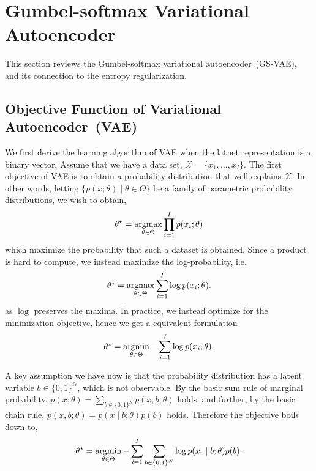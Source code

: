 \documentclass[10pt,letterpaper]{article}
\newcommand{\argmin}{\mathop{\rm argmin}}
\newcommand{\argmax}{\mathop{\rm argmax}}
\begin{document}
\section{Gumbel-softmax Variational Autoencoder}
This section reviews the Gumbel-softmax variational autoencoder~(GS-VAE), and its connection to the entropy regularization.

\subsection{Objective Function of Variational Autoencoder~(VAE)}
We first derive the learning algorithm of VAE when the latnet representation is a binary vector.
Assume that we have a data set, $\mathcal{X}=\{x_1,\dots,x_I\}$.
The first objective of VAE is to obtain a probability distribution that well explains $\mathcal{X}$.
In other words, letting $\{p(x;\theta) \mid \theta\in\Theta\}$ be a family of parametric probability distributions, we wish to obtain,
\begin{align*}
\theta^\star = \argmax_{\theta\in\Theta} \prod_{i=1}^I p(x_i;\theta)
\end{align*}
which maximize the probability that such a dataset is obtained. Since a product is hard to compute, we instead maximize the log-probability, i.e.
\begin{align*}
\theta^\star = \argmax_{\theta\in\Theta} \sum_{i=1}^I \log p(x_i;\theta).
\end{align*}
as $\log$ preserves the maxima.
In practice, we instead optimize for the minimization objective, hence we get a equivalent formulation
\begin{align*}
\theta^\star = \argmin_{\theta\in\Theta} - \sum_{i=1}^I \log p(x_i;\theta).
\end{align*}


A key assumption we have now is that the probability distribution has a latent variable $b\in\{0,1\}^N$, which is not observable.
By the basic sum rule of marginal probability,
$p(x;\theta) = \sum_{b\in\{0,1\}^N}p(x, b;\theta)$ holds, and further,
by the basic chain rule,
$p(x, b;\theta) = p(x \mid b;\theta)p(b)$ holds.
Therefore the objective boils down to,
\begin{align}
\label{eq:vae-obj} \theta^\star = \argmin_{\theta\in\Theta} -\sum_{i=1}^I \sum_{b\in\{0,1\}^N}\log p(x_i \mid b;\theta)p(b).
\end{align}
\end{document}
